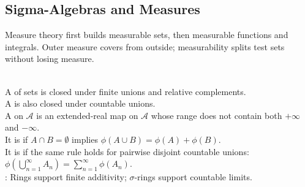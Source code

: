 \subsection{Sigma-Algebras and Measures}

%

Measure theory first builds measurable sets, then measurable functions and integrals. Outer measure covers from outside; measurability splits test sets without losing measure.

\begin{definition} \label{def:measure-measurability-core-source-todo}\label{def:ring-sigma-ring-set-function} \\
A  of sets is closed under finite unions and relative complements.\\
A  is also closed under countable unions.\\
A  on $\mathcal{A}$ is an extended-real map on $\mathcal{A}$ whose range does not contain both $+\infty$ and $-\infty$.\\
It is  if $A\cap B=\emptyset$ implies $\phi(A\cup B)=\phi(A)+\phi(B)$.\\
It is  if the same rule holds for pairwise disjoint countable unions: $\phi\left(\bigcup\limits_{n=1}^{\infty}A_n\right)=\sum\limits_{n=1}^{\infty}\phi(A_n)$.\\
: Rings support finite additivity; $\sigma$-rings support countable limits.
\end{definition}

